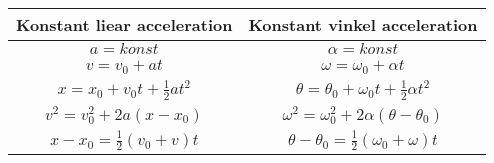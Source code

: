 \begin{tabular}{|c|c|}
	\hline
	Konstant liear acceleration&Konstant vinkel acceleration\\
	\hline
	$a=konst$&$\alpha=konst$\\
	$v=v_0+at$&$\omega=\omega_0+\alpha t$\\
	$x=x_0+v_0t+\frac{1}{2}at^2$&$\theta=\theta_0+\omega_0t+\frac{1}{2}\alpha t^2$\\
	$v^2=v_0^2+2a(x-x_0)$&$\omega^2=\omega_0^2+2\alpha(\theta-\theta_0)$\\
	$x-x_0=\frac{1}{2}(v_0+v)t$&$\theta-\theta_0=\frac{1}{2}(\omega_0+\omega)t$\\
	\hline
\end{tabular}